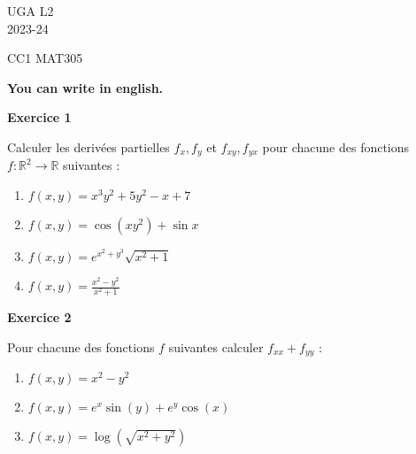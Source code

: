 \documentclass[a4paper,12pt]{article}
\begin{document}
	\noindent UGA \hfill L2\\
	\hfill 2023-24 \\
	\bigskip

	\begin{center}
		\textsc{CC1 MAT305}


{\bf You can write in english.}
		

	\end{center}
	\bigskip
	
\hrulefill
	
\vspace{1cm}

 

\begin{center}
{\large{\bf Exercice 1}}
\end{center}


Calculer les derivées partielles $f_x,f_y$ et $f_{xy}, f_{yx}$ pour
chacune des fonctions\\ 
$f:\mathbb{R}^2 \rightarrow \mathbb{R}$  suivantes :

 
 \begin{enumerate}
 
\item  $f(x,y) = x^3y^2+ 5y^2-x+7$

\item $ f(x,y) = \cos(xy^2)+\sin x$

\item $ f(x,y) = e^{x^2 + y^3}\sqrt{x^2+1}$

\item $f(x,y) = \frac{x^2 - y^2}{x^2 + 1}$

 \end{enumerate}


\hrulefill

\vspace{1cm}

\begin{center}
{\large{\bf Exercice 2}}
\end{center}

Pour chacune des fonctions $f$ suivantes calculer $f_{xx} + f_{yy}$
: 

\begin{enumerate}
	\item $f(x,y)=  x^2 - y^2$
	\item $f(x,y) = e^x \sin(y) + e^y \cos(x)$
	\item $f(x,y)=  \log(\sqrt{ x^2 + y^2})$
	
\end{enumerate}
\end{document}
